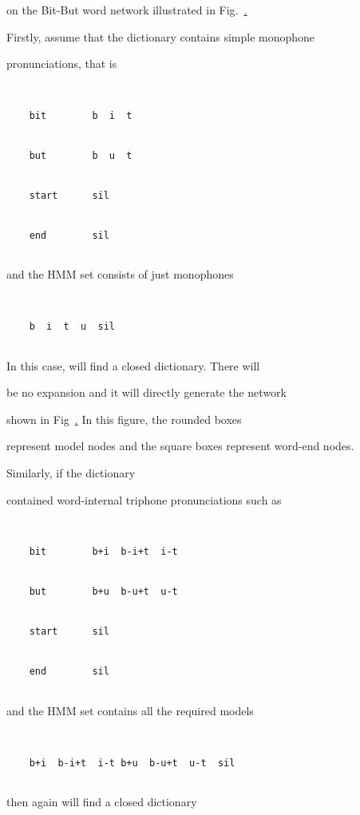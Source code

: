 on the Bit-But word network illustrated in Fig.~\href{f:wdnet}.


Firstly, assume that the dictionary contains simple monophone


pronunciations, that is


\begin{verbatim}


    bit        b  i  t 


    but        b  u  t


    start      sil


    end        sil


\end{verbatim}


and the HMM set consists of just monophones


\begin{verbatim}


    b  i  t  u  sil


\end{verbatim}


In this case,  will find a closed dictionary.  There will


be no expansion and it will directly generate the network 


shown in Fig~\href{f:mononet}.  In this figure, the rounded boxes


represent model nodes and the square boxes represent word-end nodes.





Similarly, if the dictionary


contained word-internal triphone pronunciations such as


\begin{verbatim}


    bit        b+i  b-i+t  i-t 


    but        b+u  b-u+t  u-t


    start      sil


    end        sil


\end{verbatim}


and the HMM set contains all the required models


\begin{verbatim}


    b+i  b-i+t  i-t b+u  b-u+t  u-t  sil


\end{verbatim}


then again  will find a closed dictionary


